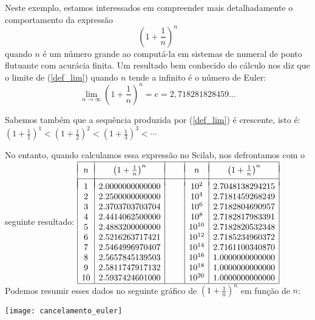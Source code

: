 \begin{ex} Neste exemplo, estamos interessados em compreender mais detalhadamente o comportamento da expressão
\begin{equation}\label{def_lim}\left(1+\frac{1}{n}\right)^n\end{equation}
quando $n$ é um número grande ao computá-la em sistemas de numeral de ponto flutuante com acurácia finita.
Um resultado bem conhecido do cálculo nos diz que o limite de (\ref{def_lim}) quando $n$ tende a infinito é o número de Euler:
\begin{equation}\label{lim}\lim_{n\to \infty}\left(1+\frac{1}{n}\right)^n=e= 2,718281828459...\end{equation}

Sabemos também que a sequência produzida por (\ref{def_lim}) é crescente, isto é:
$\left(1+\frac{1}{1}\right)^1< \left(1+\frac{1}{2}\right)^2< \left(1+\frac{1}{3}\right)^3 < \cdots $

No entanto, quando calculamos essa expressão no Scilab, nos defrontamos com o seguinte resultado:
$\begin{array}{|c|c|c|c|c|}
\hline &&&&\\[-0.3cm]
n & \left(1+\frac{1}{n}\right)^n&~~~~&n & \left(1+\frac{1}{n}\right)^n\\
 &&&&\\[-0.3cm]
\hline\\[-0.3cm]
1 & 2.0000000000000 && 10^{2} & 2.7048138294215 \\
2 & 2.2500000000000 && 10^{4} & 2.7181459268249 \\
3 & 2.3703703703704 && 10^{6} & 2.7182804690957 \\
4 & 2.4414062500000 && 10^{8} & 2.7182817983391 \\
5 & 2.4883200000000 && 10^{10} & 2.7182820532348 \\
6 & 2.5216263717421 && 10^{12} & 2.7185234960372 \\
7 & 2.5464996970407 && 10^{14} & 2.7161100340870 \\
8 & 2.5657845139503 && 10^{16} & 1.0000000000000 \\
9 & 2.5811747917132 && 10^{18} & 1.0000000000000 \\
10 & 2.5937424601000 && 10^{20} & 1.0000000000000 \\
\hline
\end{array}
$
Podemos resumir esses dados no seguinte gráfico de $\left(1+\frac{1}{n}\right)^n$ em função de $n$:

\texttt{[image: cancelamento\_euler]}


\end{ex}
